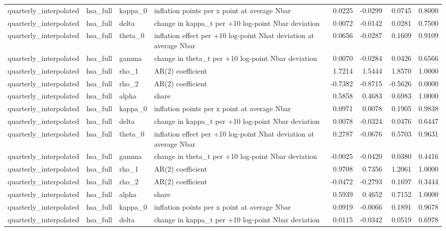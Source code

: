 \begin{tabular}{llllrrrr}
quarterly\_interpolated & hsa\_full & kappa\_0 & inflation points per x point at average Nbar & 0.0225 & -0.0299 & 0.0745 & 0.8000 \\
quarterly\_interpolated & hsa\_full & delta & change in kappa\_t per +10 log-point Nbar deviation & 0.0072 & -0.0142 & 0.0281 & 0.7500 \\
quarterly\_interpolated & hsa\_full & theta\_0 & inflation effect per +10 log-point Nhat deviation at average Nbar & 0.0656 & -0.0287 & 0.1609 & 0.9109 \\
quarterly\_interpolated & hsa\_full & gamma & change in theta\_t per +10 log-point Nbar deviation & 0.0070 & -0.0284 & 0.0426 & 0.6566 \\
quarterly\_interpolated & hsa\_full & rho\_1 & AR(2) coefficient & 1.7214 & 1.5444 & 1.8570 & 1.0000 \\
quarterly\_interpolated & hsa\_full & rho\_2 & AR(2) coefficient & -0.7382 & -0.8715 & -0.5626 & 0.0000 \\
quarterly\_interpolated & hsa\_full & alpha & share & 0.5858 & 0.4683 & 0.6983 & 1.0000 \\
quarterly\_interpolated & hsa\_full & kappa\_0 & inflation points per x point at average Nbar & 0.0971 & 0.0078 & 0.1905 & 0.9838 \\
quarterly\_interpolated & hsa\_full & delta & change in kappa\_t per +10 log-point Nbar deviation & 0.0078 & -0.0324 & 0.0476 & 0.6447 \\
quarterly\_interpolated & hsa\_full & theta\_0 & inflation effect per +10 log-point Nhat deviation at average Nbar & 0.2787 & -0.0676 & 0.5703 & 0.9631 \\
quarterly\_interpolated & hsa\_full & gamma & change in theta\_t per +10 log-point Nbar deviation & -0.0025 & -0.0420 & 0.0380 & 0.4416 \\
quarterly\_interpolated & hsa\_full & rho\_1 & AR(2) coefficient & 0.9708 & 0.7356 & 1.2061 & 1.0000 \\
quarterly\_interpolated & hsa\_full & rho\_2 & AR(2) coefficient & -0.0472 & -0.2793 & 0.1697 & 0.3444 \\
quarterly\_interpolated & hsa\_full & alpha & share & 0.5939 & 0.4652 & 0.7152 & 1.0000 \\
quarterly\_interpolated & hsa\_full & kappa\_0 & inflation points per x point at average Nbar & 0.0919 & -0.0066 & 0.1891 & 0.9678 \\
quarterly\_interpolated & hsa\_full & delta & change in kappa\_t per +10 log-point Nbar deviation & 0.0115 & -0.0342 & 0.0519 & 0.6978 \\

\end{tabular}
